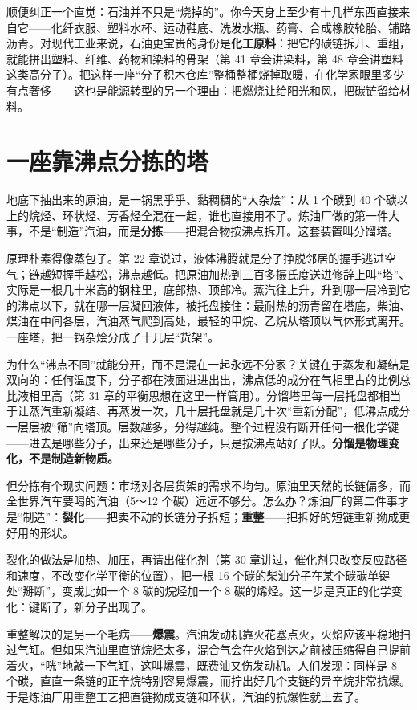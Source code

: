 顺便纠正一个直觉：石油并不只是“烧掉的”。你今天身上至少有十几样东西直接来自它——化纤衣服、塑料水杯、运动鞋底、洗发水瓶、药膏、合成橡胶轮胎、铺路沥青。对现代工业来说，石油更宝贵的身份是\textbf{化工原料}：把它的碳链拆开、重组，就能拼出塑料、纤维、药物和染料的骨架（第 41 章会讲染料，第 48 章会讲塑料这类高分子）。把这样一座“分子积木仓库”整桶整桶烧掉取暖，在化学家眼里多少有点奢侈——这也是能源转型的另一个理由：把燃烧让给阳光和风，把碳链留给材料。

\section{一座靠沸点分拣的塔}

地底下抽出来的原油，是一锅黑乎乎、黏稠稠的“大杂烩”：从 1 个碳到 40 个碳以上的烷烃、环状烃、芳香烃全混在一起，谁也直接用不了。炼油厂做的第一件大事，不是“制造”汽油，而是\textbf{分拣}——把混合物按沸点拆开。这套装置叫分馏塔。

原理朴素得像蒸包子。第 22 章说过，液体沸腾就是分子挣脱邻居的握手逃进空气；链越短握手越松，沸点越低。把原油加热到三百多摄氏度送进修辞上叫“塔”、实际是一根几十米高的钢柱里，底部热、顶部冷。蒸汽往上升，升到哪一层冷到它的沸点以下，就在哪一层凝回液体，被托盘接住：最耐热的沥青留在塔底，柴油、煤油在中间各层，汽油蒸气爬到高处，最轻的甲烷、乙烷从塔顶以气体形式离开。一座塔，把一锅杂烩分成了十几层“货架”。

\begin{qiaoliang}
为什么“沸点不同”就能分开，而不是混在一起永远不分家？关键在于蒸发和凝结是双向的：任何温度下，分子都在液面进进出出，沸点低的成分在气相里占的比例总比液相里高（第 31 章的平衡思想在这里一样管用）。分馏塔里每一层托盘都相当于让蒸汽重新凝结、再蒸发一次，几十层托盘就是几十次“重新分配”，低沸点成分一层层被“筛”向塔顶。层数越多，分得越纯。整个过程没有断开任何一根化学键——进去是哪些分子，出来还是哪些分子，只是按沸点站好了队。\textbf{分馏是物理变化，不是制造新物质。}
\end{qiaoliang}

但分拣有个现实问题：市场对各层货架的需求不均匀。原油里天然的长链偏多，而全世界汽车要喝的汽油（5～12 个碳）远远不够分。怎么办？炼油厂的第二件事才是“制造”：\textbf{裂化}——把卖不动的长链分子拆短；\textbf{重整}——把拆好的短链重新拗成更好用的形状。

裂化的做法是加热、加压，再请出催化剂（第 30 章讲过，催化剂只改变反应路径和速度，不改变化学平衡的位置），把一根 16 个碳的柴油分子在某个碳碳单键处“掰断”，变成比如一个 8 碳的烷烃加一个 8 碳的烯烃。这一步是真正的化学变化：键断了，新分子出现了。

重整解决的是另一个毛病——\textbf{爆震}。汽油发动机靠火花塞点火，火焰应该平稳地扫过气缸。但如果汽油里直链烷烃太多，混合气会在火焰到达之前被压缩得自己提前着火，“咣”地敲一下气缸，这叫爆震，既费油又伤发动机。人们发现：同样是 8 个碳，直直一条链的正辛烷特别容易爆震，而拧出好几个支链的异辛烷非常抗爆。于是炼油厂用重整工艺把直链拗成支链和环状，汽油的抗爆性就上去了。

